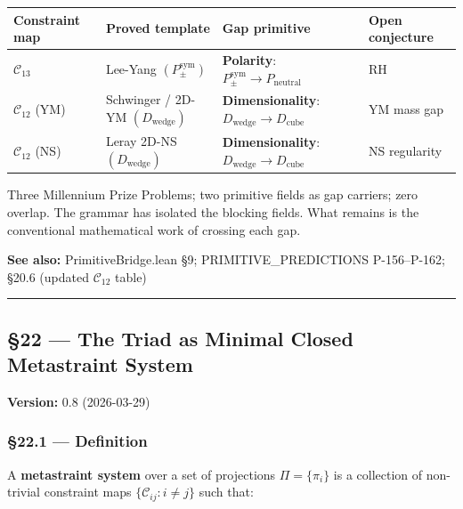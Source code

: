 \documentclass[12pt,a4paper]{article}
\newcommand{\pilcrow}{\S}
\begin{document}
\begin{table}[htbp]
\centering
\small
{}
\begin{tabularx}{\textwidth}{>{\centering\arraybackslash}X >{\centering\arraybackslash}X >{\centering\arraybackslash}X >{\centering\arraybackslash}X}
\toprule
\rowcolor{gray!25}\textbf{Constraint map} & \textbf{Proved template} & \textbf{Gap primitive} & \textbf{Open conjecture} \\
\midrule
\rowcolors{1}{white}{gray!10}
$\mathcal{C}_{13}$ & Lee-Yang $(P_{\pm}^{\text{sym}})$ & \textbf{Polarity}: $P_{\pm}^{\text{sym}} \to P_\text{neutral}$ & RH \\
$\mathcal{C}_{12}$ (YM) & Schwinger / 2D-YM $(D_\text{wedge})$ & \textbf{Dimensionality}: $D_\text{wedge} \to D_\text{cube}$ & YM mass gap \\
$\mathcal{C}_{12}$ (NS) & Leray 2D-NS $(D_\text{wedge})$ & \textbf{Dimensionality}: $D_\text{wedge} \to D_\text{cube}$ & NS regularity \\
\bottomrule
\end{tabularx}
\end{table}

Three Millennium Prize Problems; two primitive fields as gap carriers; zero overlap. The grammar has isolated the blocking fields. What remains is the conventional mathematical work of crossing each gap.

\textbf{See also:} PrimitiveBridge.lean \pilcrow{}9; PRIMITIVE\_PREDICTIONS P-156--P-162; \pilcrow{}20.6 (updated $\mathcal{C}_{12}$ table)

\begin{center}
\rule{0.5\textwidth}{0.4pt}
\end{center}

\subsection{\pilcrow{}22 --- The Triad as Minimal Closed Metastraint System}

\textbf{Version:} 0.8 (2026-03-29)

\subsubsection{\pilcrow{}22.1 --- Definition}

A \textbf{metastraint system} over a set of projections $\Pi = \{\pi_i\}$ is a collection of non-trivial constraint maps $\{\mathcal{C}_{ij} : i \neq j\}$ such that:
\end{document}
